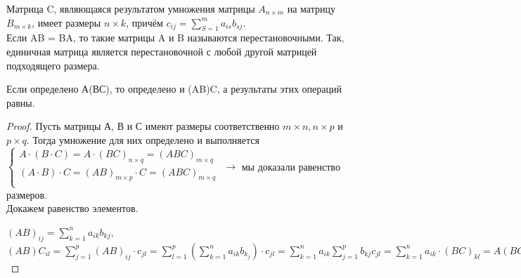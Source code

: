 	Матрица C, являющаяся результатом умножения матрицы $A_{n \times m}$ на матрицу $B_{m \times k}$, имеет размеры $n \times k$, причём $c_{ij} = \sum_{S = 1}^{m} a_{is}b_{sj}$.\\
	
	Если AB = BA, то такие матрицы A и B называются $\textit{перестановочными}$. Так, единичная матрица является перестановочной с любой другой матрицей подходящего размера.
	
	\begin{theorem}
		Если определено А(ВС), то определено и (AB)C, а результаты этих операций равны.
	\end{theorem}
	\begin{proof}
		Пусть матрицы А, В и С имеют размеры соответственно $m \times n, n \times p$ и $p \times q$. Тогда умножение для них определено и выполняется\\
		
		$\begin{cases}
			A \cdot (B \cdot C) = A \cdot (BC)_{n \times q} = (ABC)_{m \times q}\\
			(A \cdot B) \cdot C = (AB)_{m \times p} \cdot C = (ABC)_{m \times q}\\
		\end{cases}$ $\longrightarrow$ мы доказали равенство размеров.\\
		\newline
		Докажем равенство элементов.\\
		
		\newline
		
		$(AB)_{ij} = \sum_{k = 1}^{n} a_{ik}b_{kj}$, $(AB)C_{il} = \sum_{j = 1}^{p} (AB)_{ij} \cdot c_{jl} = \sum_{l = 1}^{p}(\sum_{k = 1}^{n} a_{ik}b_{k_j}) \cdot c_{jl} = \sum_{k = 1}^{n} a_{ik} \sum_{j = 1}^{p} b_{kj}c_{jl} = \sum_{k = 1}^{n} a_{ik} \cdot (BC)_{kl} = A(BC)_{il}$
	\end{proof}
